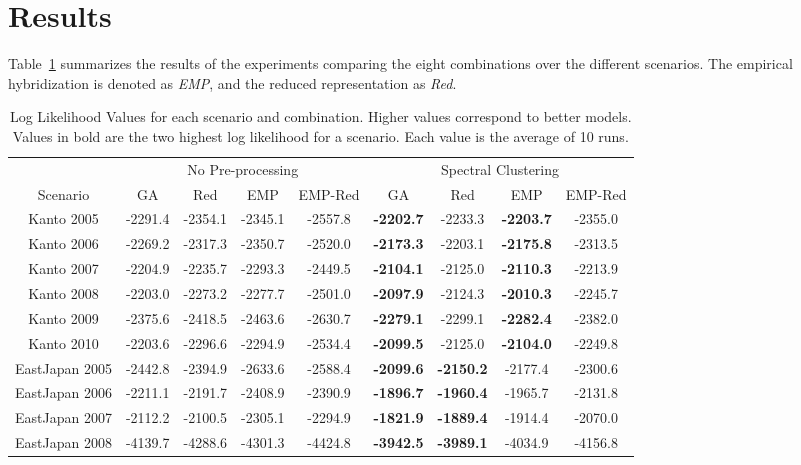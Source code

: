 \section{Results}
\label{sec:results}

Table~\ref{tab:loglikelihood} summarizes the results of the
experiments comparing the eight combinations over the different
scenarios. The empirical hybridization is denoted as \emph{EMP}, and
the reduced representation as \emph{Red}.

\begin{table}
  \caption{Log Likelihood Values for each scenario and
    combination. Higher values correspond to better models. Values in
    bold are the two highest log likelihood for a scenario. Each value
    is the average of 10 runs.}
  \label{tab:loglikelihood}
  \begin{tabular}{|c|c|c|c|c|c|c|c|c|}
    \hline
    & \multicolumn{4}{|c|}{No Pre-processing} & \multicolumn{4}{|c|}{Spectral Clustering}\\
    Scenario & GA & Red & EMP & EMP-Red & GA & Red & EMP & EMP-Red\\
    \hline
    Kanto 2005 & -2291.4 & -2354.1 & -2345.1 & -2557.8 & {\bf-2202.7} & -2233.3 & {\bf-2203.7} & -2355.0\\
    Kanto 2006 & -2269.2 & -2317.3 & -2350.7 & -2520.0 & {\bf-2173.3} & -2203.1 & {\bf-2175.8} & -2313.5\\
    Kanto 2007 & -2204.9 & -2235.7 & -2293.3 & -2449.5 & {\bf-2104.1} & -2125.0 & {\bf-2110.3} & -2213.9\\
    Kanto 2008 & -2203.0 & -2273.2 & -2277.7 & -2501.0 & {\bf-2097.9} & -2124.3 & {\bf-2010.3} & -2245.7\\
    Kanto 2009 & -2375.6 & -2418.5 & -2463.6 & -2630.7 & {\bf-2279.1} & -2299.1 & {\bf-2282.4} & -2382.0\\
    Kanto 2010 & -2203.6 & -2296.6 & -2294.9 & -2534.4 & {\bf-2099.5} & -2125.0 & {\bf-2104.0} & -2249.8\\
    \hline
    EastJapan 2005 &-2442.8&-2394.9&-2633.6&-2588.4& {\bf-2099.6} & {\bf-2150.2} & -2177.4 & -2300.6 \\
    EastJapan 2006 &-2211.1&-2191.7&-2408.9&-2390.9&{\bf-1896.7}&{\bf-1960.4}&-1965.7&-2131.8\\
    EastJapan 2007 &-2112.2&-2100.5&-2305.1&-2294.9&{\bf-1821.9}&{\bf-1889.4}&-1914.4&-2070.0\\
    EastJapan 2008 &-4139.7&-4288.6&-4301.3&-4424.8&{\bf-3942.5}&{\bf-3989.1}&-4034.9&-4156.8\\

\end{tabular}
\end{table}
